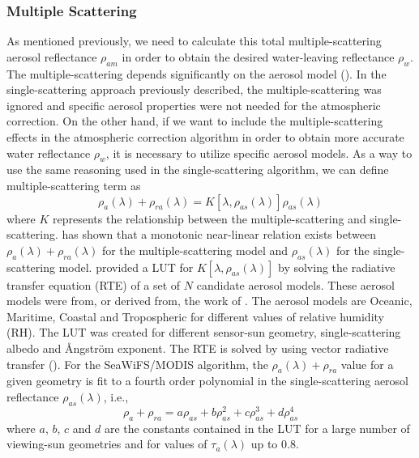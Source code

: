 \subsubsection{Multiple Scattering}
As mentioned  previously, we need to calculate this total multiple-scattering aerosol reflectance $\rho_{am}$ in order to obtain the desired water-leaving reflectance $\rho_w$. The multiple-scattering depends significantly on the aerosol model (\cite{Gordon:1997}). In the single-scattering approach previously described, the multiple-scattering was ignored and specific aerosol properties were not needed for the atmospheric correction. On the other hand, if we want to include the multiple-scattering effects in the atmospheric correction algorithm in order to obtain more accurate water reflectance $\rho_w$, it is necessary to utilize specific aerosol models. As a way to use the same reasoning used in the single-scattering algorithm, we can define multiple-scattering term as
\begin{equation}\label{eq:multscat}
  \rho_a(\lambda) + \rho_{ra}(\lambda) = K[\lambda,\rho_{as}(\lambda)]\rho_{as}(\lambda)
\end{equation}
where $K$ represents the relationship between the multiple-scattering and single-scattering. \cite{Wang:1991} has shown that a monotonic near-linear relation exists between $\rho_a(\lambda)+\rho_{ra}(\lambda)$ for the multiple-scattering model and $\rho_{as}(\lambda)$ for the single-scattering model. \cite{Gordon:1994} provided a LUT for $K[\lambda,\rho_{as}(\lambda)]$ by solving the radiative transfer equation (RTE) of a set of $N$ candidate aerosol models. These aerosol models were from, or derived from, the work of \cite{Shettle:1979}. The aerosol models are Oceanic, Maritime, Coastal and Tropospheric for different values of relative humidity (RH). The LUT was created for different sensor-sun geometry, single-scattering albedo and \AA ngstr\"{o}m exponent. The RTE is solved by using vector radiative transfer (\cite{IOCCG:2010}). For the SeaWiFS/MODIS algorithm, the $\rho_a(\lambda)+\rho_{ra}$ value for a given geometry is fit to a fourth order polynomial in the single-scattering aerosol reflectance $\rho_{as}(\lambda)$, i.e.,
\begin{equation}\label{eq:polynomial}
  \rho_a+\rho_{ra} = a\rho_{as}+b\rho_{as}^2+c\rho_{as}^3+d\rho_{as}^4
\end{equation}
where $a$, $b$, $c$ and $d$ are the constants contained in the LUT for a large number of viewing-sun geometries and for values of $\tau_a(\lambda)$ up to $0.8$.

